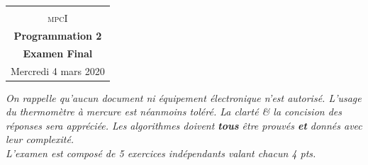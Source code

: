 \documentclass
[12pt]
{article}
\begin{document}
\begin{center}
  \begin{tabular}{c}
  \hline\\%
  {\textsc{mpcI}}\vspace{0.1cm}
  \\
%  
    {\bf {\Large Programmation 2}}\\\vspace{0.2cm}
    {\bf  { Examen Final}}\\
    {\footnotesize Mercredi 4 mars 2020}\\
    \hline
  \end{tabular}
\end{center}
\vspace{0.6cm}
%
%
{\em On rappelle qu'aucun document ni équipement électronique n'est autorisé. L'usage du thermomètre à mercure est néanmoins toléré. La clarté \& la concision des réponses sera appréciée. Les algorithmes doivent {\bf tous} être prouvés {\bf et} donnés avec leur complexité.}\\

{\em L'examen est composé de 5 exercices indépendants valant chacun 4 pts.}\\
\end{document}
